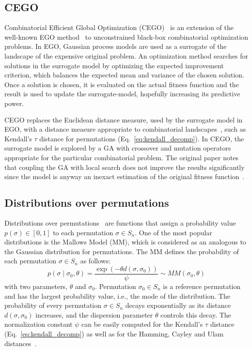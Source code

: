 \documentclass[runningheads]{llncs}
\newcommand{\Prob}{\ensuremath{p}}
\begin{document}
\subsection{CEGO}

Combinatorial Efficient Global Optimization
(CEGO)~\citep{ZaeStoFriFisNauBar2014} is an extension of the well-known EGO
method~\citep{JonSchWel98go} to unconstrained black-box combinatorial
optimization problems. In EGO, Gaussian process models are used as a surrogate
of the landscape of the expensive original problem. An optimization method
searches for solutions in the surrogate model by optimizing the expected
improvement criterion, which balances the expected mean and variance of the
chosen solution. Once a solution is chosen, it is evaluated on the actual
fitness function and the result is used to update the surrogate-model,
hopefully increasing its predictive power.

CEGO replaces the Euclidean distance measure, used by the surrogate model in
EGO, with a distance measure appropriate to combinatorial
landscapes~\citep{ZaeStoBar2014:ppsn}, such as Kendall's $\tau$ distance for
permutations (Eq.~\ref{eq:kendall_decomp}). In CEGO, the surrogate model is
explored by a GA with crossover and mutation operators appropriate for the
particular combinatorial problem. The original paper notes that coupling the GA
with local search does not improve the results significantly since the model is
anyway an inexact estimation of the original fitness
function~\citep[p.~875]{ZaeStoFriFisNauBar2014}.


\subsection{Distributions over permutations}
Distributions over permutations~\cite{critchlow91} are functions that assign a probability value  $\Prob(\sigma)\in[0,1]$ to each permutation $\sigma \in S_n$. One of the most popular distributions is the Mallows Model (MM), which is considered as an analogous to the Gaussian distribution for permutations. The MM defines the probability of each permutation $\sigma\in S_n$ as follows:
%
\begin{equation}\label{eq:MM}
\Prob(\sigma \mid \sigma_0, \theta )= \frac{\exp(-\theta d(\sigma, \sigma_0))}{\psi} \sim MM(\sigma_0, \theta)
\end{equation}
%
with two parameters, $\theta$ and $\sigma_0$. Permutation $\sigma_0\in S_n$ is a reference permutation and has the largest probability value, i.e., the mode of the distribution. The probability of every permutation $\sigma\in S_n$ decays exponentially as its distance $d(\sigma,\sigma_0)$ increases, and the dispersion parameter $\theta$  controls this decay.  The normalization constant $\psi$ can be easily computed for the Kendall's $\tau$ distance (Eq.~\eqref{eq:kendall_decomp}) as well as for the Hamming, Cayley and Ulam distances~\cite{IruCalLoz2016permallows}.
\end{document}
